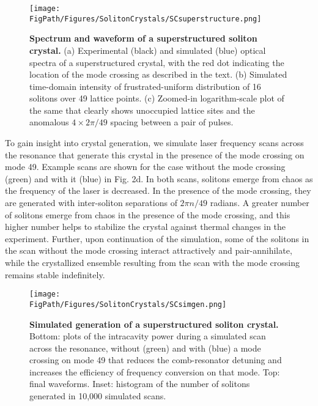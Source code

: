 \begin{figure}[htpb]
	\begin{center}
		\texttt{[image: \\FigPath/Figures/SolitonCrystals/SCsuperstructure.png]}
	\end{center}
	\caption[Spectrum and waveform of a superstructed soliton crystal]{\textbf{Spectrum and waveform of a superstructured soliton crystal.} (a) Experimental (black) and simulated (blue) optical spectra of a superstructured crystal, with the red dot indicating the location of the mode crossing as described in the text. (b) Simulated time-domain intensity of frustrated-uniform distribution of 16 solitons over 49 lattice points. (c) Zoomed-in logarithm-scale plot of the same that clearly shows unoccupied lattice sites and the anomalous $4\times2\pi/49$ spacing between a pair of pulses.}
	\label{fig:SCsuperstructure}
\end{figure} 

To gain insight into crystal generation, we simulate laser frequency scans across the resonance that generate this crystal in the presence of the mode crossing on mode 49. Example scans are shown for the case without the mode crossing (green) and with it (blue) in Fig. 2d. In both scans, solitons emerge from chaos as the frequency of the laser is decreased. In the presence of the mode crossing, they are generated with inter-soliton separations of $2\pi n/49$ radians. A greater number of solitons emerge from chaos in the presence of the mode crossing, and this higher number helps to stabilize the crystal against thermal changes in the experiment. Further, upon continuation of the simulation, some of the solitons in the scan without the mode crossing interact attractively and pair-annihilate, while the crystallized ensemble resulting from the scan with the mode crossing remains stable indefinitely.

\begin{figure}[htpb]
	\begin{center}
		\texttt{[image: \\FigPath/Figures/SolitonCrystals/SCsimgen.png]}
	\end{center}
	\caption[Simulated generation of a superstructured soliton crystal]{\textbf{Simulated generation of a superstructured soliton crystal.} Bottom: plots of the intracavity power during a simulated scan across the resonance, without (green) and with (blue) a mode crossing on mode 49 that reduces the comb-resonator detuning and increases the efficiency of frequency conversion on that mode. Top: final waveforms. Inset: histogram of the number of solitons generated in 10,000 simulated scans.}
	\label{fig:SCsimgen}
\end{figure} 

